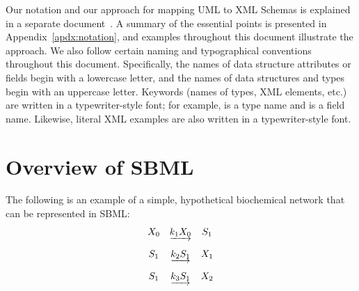 \documentclass[10pt]{cekarticle}
\begin{document}
Our notation and our approach for mapping UML to XML Schemas is explained
in a separate document~\citep{hucka:2000b}.  A summary of the essential
points is presented in Appendix~\ref{apdx:notation}, and examples
throughout this document illustrate the approach.  We also follow certain
naming and typographical conventions throughout this document.
Specifically, the names of data structure attributes or fields begin with a
lowercase letter, and the names of data structures and types begin with an
uppercase letter.  Keywords (names of types, XML elements, etc.) are
written in a typewriter-style font; for example,  is a
type name and  is a field name.  Likewise, literal XML
examples are also written in a typewriter-style font.


\section{Overview of SBML}
\label{sec:overview}

The following is an example of a simple, hypothetical biochemical network that
can be represented in SBML:
\begin{equation*}
  \begin{array}{@{}ccc@{}}
    X_0 & \underrightarrow{k_1 X_0} & S_1 \\ \\[-4pt]
    S_1 & \underrightarrow{k_2 S_1} & X_1 \\ \\[-4pt]
    S_1 & \underrightarrow{k_3 S_1} & X_2
  \end{array}
\end{equation*}
\end{document}
